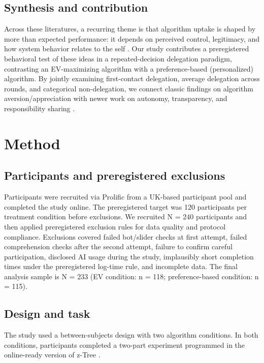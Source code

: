 \documentclass[a4paper, 12pt, fleqn]{article}
\theoremstyle{definition}
\begin{document}
\subsection{Synthesis and contribution}
Across these literatures, a recurring theme is that algorithm uptake is shaped by more than expected performance: it depends on perceived control, legitimacy, and how system behavior relates to the self \citep{Dietvorst2018,Logg2019,Chugunova2022}. Our study contributes a preregistered behavioral test of these ideas in a repeated-decision delegation paradigm, contrasting an EV-maximizing algorithm with a preference-based (personalized) algorithm. By jointly examining first-contact delegation, average delegation across rounds, and categorical non-delegation, we connect classic findings on algorithm aversion/appreciation with newer work on autonomy, transparency, and responsibility sharing \citep{Candrian2022,Gazit2023,Hu2024,Fink2024}.

\section{Method}
\label{sec:method}

\subsection{Participants and preregistered exclusions}
Participants were recruited via Prolific from a UK-based participant pool and completed the study online. The preregistered target was 120 participants per treatment condition before exclusions. We recruited N = 240 participants and then applied preregistered exclusion rules for data quality and protocol compliance. Exclusions covered failed bot/slider checks at first attempt, failed comprehension checks after the second attempt, failure to confirm careful participation, disclosed AI usage during the study, implausibly short completion times under the preregistered log-time rule, and incomplete data. The final analysis sample is N = 233 (EV condition: n = 118; preference-based condition: n = 115).

\subsection{Design and task}
The study used a between-subjects design with two algorithm conditions. In both conditions, participants completed a two-part experiment programmed in the online-ready version of z-Tree \citep{Fischbacher07}.
\end{document}
